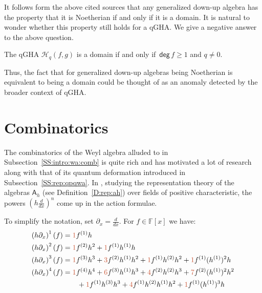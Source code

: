 \documentclass{commat}
\newcommand{\FF}{\mathbb{F}}
\newcommand{\A}{\mathsf{A}}
\newcommand{\hqfg}[1][f,g]{\mathcal{H}_q(#1)}
\newcommand\degg{\, \mathsf{deg} \,}
\newcommand{\seq}[1]{\left( #1\right)}
\newcommand\cred[1]{{\color{vermDM}#1}}
\begin{document}
It follows form the above cited sources that any generalized down-up algebra has the property that it is Noetherian if and only if it is a domain. It is natural to wonder whether this property still holds for a qGHA. We give a negative answer to the above question. 

\begin{proposition}[\cite{LR22ca}]\label{P:basic:domain}
	The qGHA $\hqfg$ is a domain if and only if $\degg f\geq 1$ and $q\neq 0$.
\end{proposition}

Thus, the fact that for generalized down-up algebras being Noetherian is equivalent to being a domain could be thought of as an anomaly detected by the broader context of qGHA.


\section{Combinatorics}\label{S:comb}

The combinatorics of the Weyl algebra alluded to in Subsection~\ref{SS:intro:wa:comb} is quite rich and has motivated a lot of research along with that of its quantum deformation introduced in Subsection~\ref{SS:rep:qpqwa}. In \cite{BLO13}, studying the representation theory of the algebras $\A_h$ (see Definition~\ref{D:rep:ah}) over fields of positive characteristic, the powers $\seq{h\frac{d}{dx}}^n$ come up in the action formulae.



\begin{example}\label{Exam:comb:E1} To simplify the notation, set $\partial_x=\frac{d}{dx}$. For $f\in\FF[x]$ we have:
	\begin{align*}
		\seq{h\partial_x}^1(f) &=  \cred{1} f^{(1)}h  \\
		\seq{h\partial_x}^2(f) &=  \cred{1}f^{(2)}h^2 +\cred{1} f^{(1)} h^{(1)} h  \\
		\seq{h\partial_x}^3(f) &=  \cred{1}f^{(3)} h^3 + \cred{3} f^{(2)} h^{(1)} h^2 + \cred{1}f^{(1)} h^{(2)} h^2 + \cred{1}f^{(1)}( h^{(1)})^2 h \\
		\seq{h\partial_x}^4(f) &= \cred{1}f^{(4)}h^4 + \cred{6} f^{(3)} h^{(1)}h^3 + \cred{4} f^{(2)} h^{(2)} h^3 + \cred{7} f^{(2)}(h^{(1)})^{2} h^2 
		\\
		& \qquad 
		+ \cred{1}f^{(1)} h^{(3)} h^3 + \cred{4} f^{(1)} h^{(2)}h^{(1)} h^2 + \cred{1}f^{(1)} (h^{(1)})^{3} h\\
	\end{align*}%
\end{example}
\end{document}
